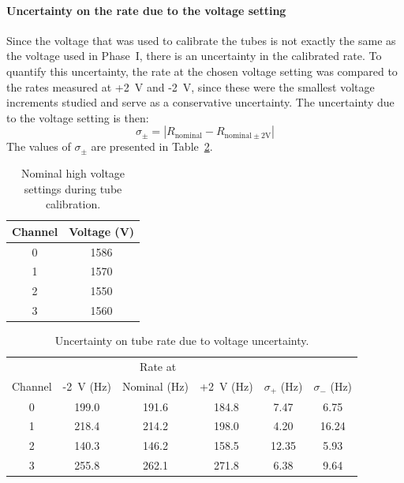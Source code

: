 \paragraph{Uncertainty on the rate due to the voltage setting} Since the voltage that was used to calibrate the \he tubes is not exactly the same as the voltage used in Phase~I, there is an uncertainty in the calibrated rate. To quantify this uncertainty, the rate at the chosen voltage setting was compared to the rates measured at +2~V and -2~V, since these were the smallest voltage increments studied and serve as a conservative uncertainty. The uncertainty due to the voltage setting is then:
\begin{equation}
	{\sigma_{\pm} = |R_{\mathrm{nominal}} - R_{\mathrm{nominal}\pm2\mathrm{ V}}| }
\end{equation}
The values of $\sigma_{\pm}$ are presented in Table~\ref{tab:VoltageUncertainty}.





\begin{table}[htb]
	\centering
	\begin{tabular}{ cc }
	Channel	& Voltage (V)	\\ \hline \hline
	0	& 1586	\\
	1	& 1570	\\
	2	& 1550	\\
	3	& 1560	\\ \hline
	\end{tabular}
	\caption[Nominal high voltage settings during \he tube calibration]{Nominal high voltage settings during \he tube calibration.}
	\label{tab:Tubevoltage}
\end{table}


\begin{table}[htb]
	\centering
	\begin{tabular}{ cccccc }
	&	\multicolumn{3}{c}{Rate at} & & \\
Channel	&	-2~V (Hz)	&	Nominal (Hz)	&	+2~V (Hz)	&	$\sigma_+$ (Hz)	&	$\sigma_{-}$ (Hz)	\\ \hline
0	&	199.0	&	191.6	&	184.8	&	7.47	&	6.75	\\
1	&	218.4	&	214.2	&	198.0	&	4.20	&	16.24	\\
2	&	140.3	&	146.2	&	158.5	&	12.35	&	5.93	\\
3	&	255.8	&	262.1	&	271.8	&	6.38	&	9.64	\\ \hline
	\end{tabular}
	\caption[Uncertainty on \he tube rate due to voltage uncertainty]{Uncertainty on \he tube rate due to voltage uncertainty.}
	\label{tab:VoltageUncertainty}
\end{table}





